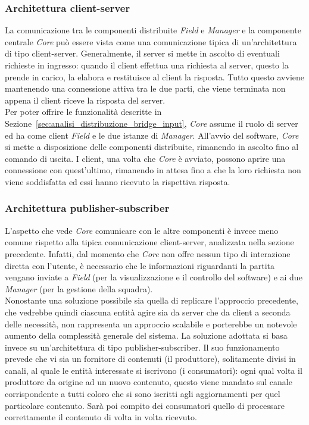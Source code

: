 \subsubsection{Architettura client-server}
\label{sec:analisi_client_server}

La comunicazione tra le componenti distribuite \textit{Field} e \textit{Manager} e la componente centrale \textit{Core} può essere vista come una comunicazione tipica di un'architettura di tipo client-server. Generalmente, il server si mette in ascolto di eventuali richieste in ingresso: quando il client effettua una richiesta al server, questo la prende in carico, la elabora e restituisce al client la risposta. Tutto questo avviene mantenendo una connessione attiva tra le due parti, che viene terminata non appena il client riceve la risposta del server.\\

Per poter offrire le funzionalità descritte in Sezione~\ref{sec:analisi_distribuzione_bridge_input}, \textit{Core} assume il ruolo di server ed ha come client \textit{Field} e le due istanze di \textit{Manager}. All'avvio del software, \textit{Core} si mette a disposizione delle componenti distribuite, rimanendo in ascolto fino al comando di uscita. I client, una volta che \textit{Core} è avviato, possono aprire una connessione con quest'ultimo, rimanendo in attesa fino a che la loro richiesta non viene soddisfatta ed essi hanno ricevuto la rispettiva risposta.

\subsubsection{Architettura publisher-subscriber}
\label{sec:analisi_client_pusblisher_subscriber}

L'aspetto che vede \textit{Core} comunicare con le altre componenti è invece meno comune rispetto alla tipica comunicazione client-server, analizzata nella sezione precedente. Infatti, dal momento che \textit{Core} non offre nessun tipo di interazione diretta con l'utente, è necessario che le informazioni riguardanti la partita vengano inviate a \textit{Field} (per la visualizzazione e il controllo del software) e ai due \textit{Manager} (per la gestione della squadra).\\

Nonostante una soluzione possibile sia quella di replicare l'approccio precedente, che vedrebbe quindi ciascuna entità agire sia da server che da client a seconda delle necessità, non rappresenta un approccio scalabile e porterebbe un notevole aumento della complessità generale del sistema. La soluzione adottata si basa invece su un'architettura di tipo publisher-subscriber. Il suo funzionamento prevede che vi sia un fornitore di contenuti (il produttore), solitamente divisi in canali, al quale le entità interessate si iscrivono (i consumatori): ogni qual volta il produttore da origine ad un nuovo contenuto, questo viene mandato sul canale corrispondente a tutti coloro che si sono iscritti agli aggiornamenti per quel particolare contenuto. Sarà poi compito dei consumatori quello di processare correttamente il contenuto di volta in volta ricevuto.\\

